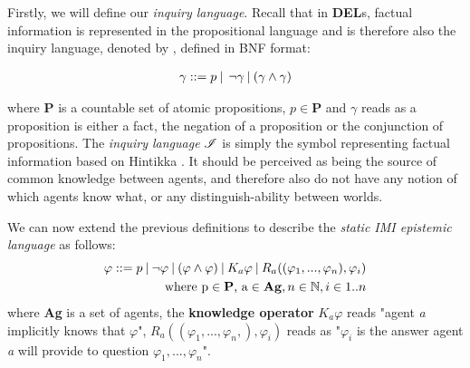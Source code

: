 Firstly, we will define our \textit{inquiry language}. Recall that in
\textbf{DEL}s, factual information is represented in the propositional language
and is therefore also the inquiry language, denoted by \oracle, defined in BNF
format:

\begin{align}
	\gamma::= p \:|\:\:\neg\gamma\:|\:(\gamma\land\gamma) \label{eq:1}
\end{align}

where \textbf{P} is a countable set of atomic propositions, $p \in\mathbf{P}$
and $\gamma$ reads as a proposition is either a fact, the negation of a
proposition or the conjunction of propositions. The \textit{inquiry language}
$\mathscr{I}$ is simply the symbol representing factual information based on
Hintikka \cite{hintikka88}. It should be perceived as being the source of
common knowledge between agents, and therefore also do not have any notion of
which agents know what, or any distinguish-ability between worlds.

We can now extend the previous definitions to describe the \textit{static IMI
	epistemic language} \staticlang\: as follows:
\begin{align}
	\begin{split}
		\varphi ::= p \:|\:\neg\varphi\:|\:(\varphi \land \varphi) \:|\: K_a\varphi \:|\: R_a((\varphi_1,...,\varphi_n), \varphi_i) \\ \text{where p} \in \text{\textbf{P}}\text{, a} \in \text{\textbf{Ag}}, n \in \mathbb{N}, i \in 1..n \label{eq:2}
	\end{split}
\end{align}
where \textbf{Ag} is a set of agents, the \textbf{knowledge operator} $K_a\varphi$ reads "agent \textit{a} implicitly knows that $\varphi$",  $R_a((\varphi_1,...,\varphi_n,), \varphi_i)$ reads as "$\varphi_i$ is the answer agent \textit{a} will provide to question $\varphi_1,...,\varphi_n$". \\

